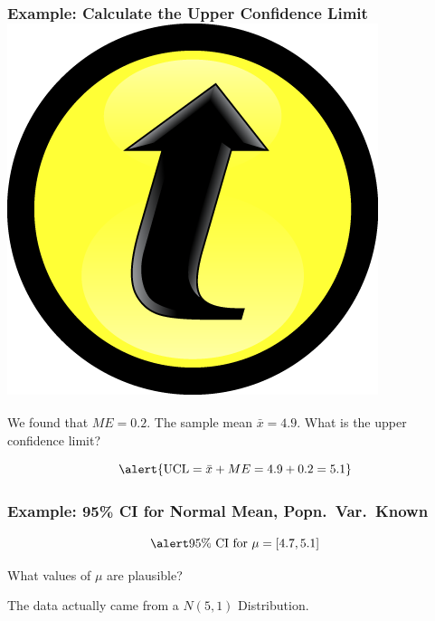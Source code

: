 \documentclass[handout]{beamer}
\begin{document}
\begin{frame}
\frametitle{Example: Calculate the Upper Confidence Limit \hfill \includegraphics[scale = 0.05]{./images/clicker}}


\begin{center}
\end{center}

We found that $ME=0.2$. The sample mean $\bar{x} = 4.9$. What is the upper confidence limit?
\pause

\vspace{2em}

	$$\alert{\mbox{UCL} = \bar{x} + ME= 4.9 + 0.2 = 5.1}$$

\end{frame}
\begin{frame}
\frametitle{Example: 95\% CI for Normal Mean, Popn.\ Var.\ Known}

\begin{center}
\end{center}

	$$\alert{\mbox{95\% CI for } \mu = [4.7, 5.1]}$$

What values of $\mu$ are plausible?

\pause
\vspace{1em}

\alert{The data actually came from a $N(5,1)$ Distribution.}

\end{frame}
\end{document}
